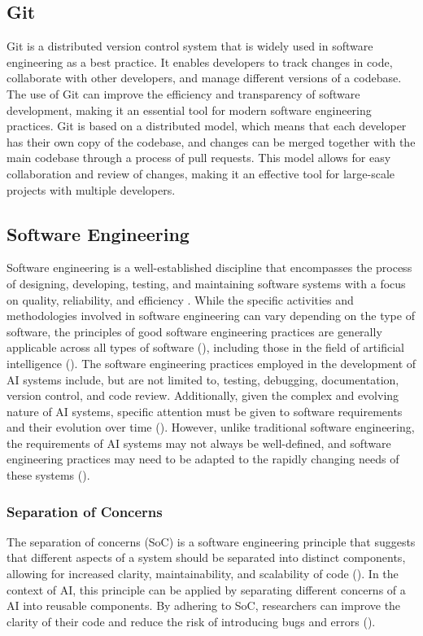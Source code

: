 \subsection{Git}
Git is a distributed version control system that is widely used in software engineering as a best practice. It enables developers to track changes in code, collaborate with other developers, and manage different versions of a codebase. The use of Git can improve the efficiency and transparency of software development, making it an essential tool for modern software engineering practices. Git is based on a distributed model, which means that each developer has their own copy of the codebase, and changes can be merged together with the main codebase through a process of pull requests. This model allows for easy collaboration and review of changes, making it an effective tool for large-scale projects with multiple developers.


\subsection{Software Engineering}
Software engineering is a well-established discipline that encompasses the process of designing, developing, testing, and maintaining software systems with a focus on quality, reliability, and efficiency \cite{pressman2010software}. While the specific activities and methodologies involved in software engineering can vary depending on the type of software, the principles of good software engineering practices are generally applicable across all types of software (\cite{pressman2010software}), including those in the field of artificial intelligence (\cite{se4dl,wan2019does,martinez2022softwareAI,davis2011understandingmodularity}). The software engineering practices employed in the development of AI systems include, but are not limited to, testing, debugging, documentation, version control, and code review. Additionally, given the complex and evolving nature of AI systems, specific attention must be given to software requirements and their evolution over time (\cite{heyn2021requirement,belani2019requirements}). However, unlike traditional software engineering, the requirements of AI systems may not always be well-defined, and software engineering practices may need to be adapted to the rapidly changing needs of these systems (\cite{heyn2021requirement,belani2019requirements}). 


\subsubsection{Separation of Concerns}
 The separation of concerns (SoC) is a software engineering principle that suggests that different aspects of a system should be separated into distinct components, allowing for increased clarity, maintainability, and scalability of code (\cite{pressman2010software, de2002importance}). 
 In the context of AI, this principle can be applied by separating different concerns of a AI into reusable components. By adhering to SoC, researchers can improve the clarity of their code and reduce the risk of introducing bugs and errors (\cite{mo2016decoupling,mo2016decoupling,pressman2010software, de2002importance}).

